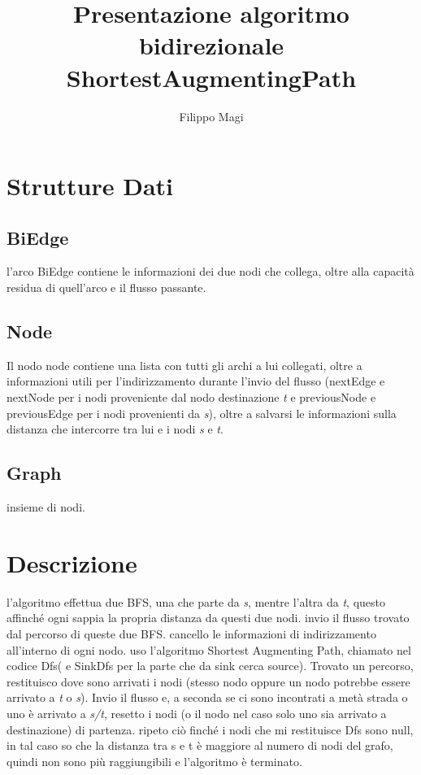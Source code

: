 \documentclass{article}
\title{Presentazione algoritmo bidirezionale ShortestAugmentingPath}
\author{Filippo Magi }
\begin{document}
\maketitle

\section{Strutture Dati}

\subsection{BiEdge}

l'arco BiEdge contiene le informazioni dei due nodi che collega, oltre alla capacità residua di quell'arco e il flusso passante.

\subsection{Node}

Il nodo node contiene una lista con tutti gli archi a lui collegati, oltre a informazioni utili per l'indirizzamento durante l'invio del flusso (nextEdge e nextNode per i nodi proveniente dal nodo destinazione \textit{t} e previousNode e previousEdge per i nodi provenienti da \textit{s}), oltre a salvarsi le informazioni sulla distanza che intercorre tra lui e i nodi \textit{s} e \textit{t}.

\subsection{Graph}

insieme di nodi.

\section{Descrizione}

l'algoritmo effettua due BFS, una che parte da \textit{s}, mentre l'altra da \textit{t}, questo affinché ogni sappia la propria distanza da questi due nodi.
invio il flusso trovato dal percorso di queste due BFS.
cancello le informazioni di indirizzamento all'interno di ogni nodo.
uso l'algoritmo Shortest Augmenting Path, chiamato nel codice Dfs( e SinkDfs per la parte che da sink cerca source).
Trovato un percorso, restituisco dove sono arrivati i nodi (stesso nodo oppure un nodo potrebbe essere arrivato a \textit{t} o \textit{s}).
Invio il flusso e, a seconda se ci sono incontrati a metà strada o uno è arrivato a \textit{s/t}, resetto i nodi (o il nodo nel caso solo uno sia arrivato a destinazione) di partenza.
ripeto ciò finché i nodi che mi restituisce Dfs sono null, in tal caso so che la distanza tra s e t è maggiore al numero di nodi del grafo, quindi non sono più raggiungibili e l'algoritmo è terminato.
\end{document}
